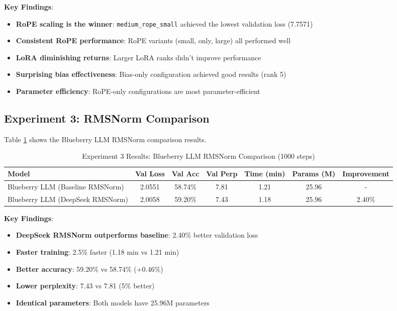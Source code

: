 \documentclass[11pt,a4paper]{article}
\begin{document}
\textbf{Key Findings}:
\begin{itemize}
    \item \textbf{RoPE scaling is the winner}: \texttt{medium\_rope\_small} achieved the lowest validation loss (7.7571)
    \item \textbf{Consistent RoPE performance}: RoPE variants (small, only, large) all performed well
    \item \textbf{LoRA diminishing returns}: Larger LoRA ranks didn't improve performance
    \item \textbf{Surprising bias effectiveness}: Bias-only configuration achieved good results (rank 5)
    \item \textbf{Parameter efficiency}: RoPE-only configurations are most parameter-efficient
\end{itemize}

\subsection{Experiment 3: RMSNorm Comparison}

Table \ref{tab:exp3_results} shows the Blueberry LLM RMSNorm comparison results.

\begin{table}[H]
\centering
\caption{Experiment 3 Results: Blueberry LLM RMSNorm Comparison (1000 steps)}
\label{tab:exp3_results}
\begin{tabular}{@{}lcccccc@{}}
\toprule
Model & Val Loss & Val Acc & Val Perp & Time (min) & Params (M) & Improvement \\
\midrule
Blueberry LLM (Baseline RMSNorm) & 2.0551 & 58.74\% & 7.81 & 1.21 & 25.96 & - \\
Blueberry LLM (DeepSeek RMSNorm) & 2.0058 & 59.20\% & 7.43 & 1.18 & 25.96 & 2.40\% \\
\bottomrule
\end{tabular}
\end{table}

\textbf{Key Findings}:
\begin{itemize}
    \item \textbf{DeepSeek RMSNorm outperforms baseline}: 2.40\% better validation loss
    \item \textbf{Faster training}: 2.5\% faster (1.18 min vs 1.21 min)
    \item \textbf{Better accuracy}: 59.20\% vs 58.74\% (+0.46\%)
    \item \textbf{Lower perplexity}: 7.43 vs 7.81 (5\% better)
    \item \textbf{Identical parameters}: Both models have 25.96M parameters
\end{itemize}
\end{document}
